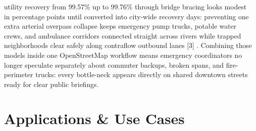 \documentclass[10pt,letterpaper]{article}
\begin{document}
utility recovery from 99.57\% up to 99.76\% through bridge bracing looks modest in percentage points until converted into city-wide recovery days: preventing one extra arterial overpass collapse keeps emergency pump trucks, potable water crews, and ambulance corridors connected straight across rivers while trapped neighborhoods clear safely along contraflow outbound lanes [3] . Combining those models inside one OpenStreetMap workflow means emergency coordinators no longer speculate separately about commuter backups, broken spans, and fire-perimeter trucks: every bottle-neck appears directly on shared downtown streets ready for clear public briefings.

\section{Applications \& Use Cases}
\end{document}
